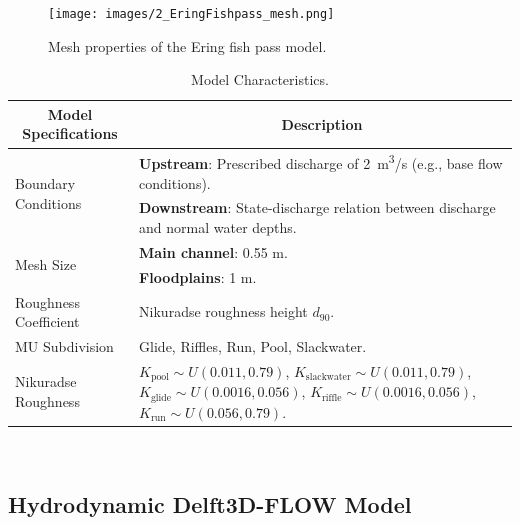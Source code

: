 \documentclass[draft,linenumbers,onecolumn]{agujournal2019} %
\begin{document}


\begin{figure}[!htbp]
	\centering
	\texttt{[image: images/2\_EringFishpass\_mesh.png]}
	\caption{Mesh properties of the Ering fish pass model.}
	\label{fig:Mesh}
\end{figure}


\begin{table}[H] 
	\centering
	\caption{Model Characteristics.}
	\begin{tabular}{p{4cm} p{10cm}}
		\hline
		\multicolumn{1}{c}{\textbf{Model Specifications}} & \multicolumn{1}{c}{\textbf{Description}} \\ \hline
		\multirow{2}{4cm}{Boundary Conditions} & \textbf{Upstream}: Prescribed discharge of 2~m\textsuperscript{3}/s (e.g., base flow conditions). \\ 
		& \textbf{Downstream}: State-discharge relation between discharge and normal water depths. \\ \hline
		\multirow{2}{4cm}{Mesh Size} & \textbf{Main channel}: 0.55 m. \\ 
		& \textbf{Floodplains}: 1 m. \\ \hline
		Roughness Coefficient & Nikuradse roughness height \(d_{90}\). \\ \hline
		MU Subdivision & Glide, Riffles, Run, Pool, Slackwater. \\ \hline
		Nikuradse Roughness & \( K_{\text{pool}} \sim U(0.011, 0.79) \), 
		\( K_{\text{slackwater}} \sim U(0.011, 0.79) \), 
		\( K_{\text{glide}} \sim U(0.0016, 0.056) \), 
		\( K_{\text{riffle}} \sim U(0.0016, 0.056) \), 
		\( K_{\text{run}} \sim U(0.056, 0.79) \). \\ \hline
	\end{tabular}
	\label{tab:model_characteristics}
\end{table}
 \vspace{-20pt}      
\FloatBarrier
\subsection{Hydrodynamic Delft3D-FLOW Model}
\label{sec:Delft3D}
\end{document}
